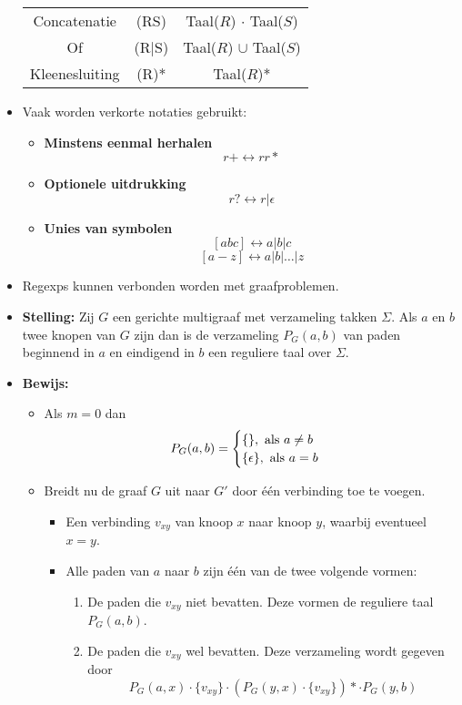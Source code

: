 \begin{itemize}
\begin{table}[h]
\begin{tabular}{c c c}
            \hline
            Concatenatie & (RS) & Taal($R$) $\cdot$ Taal($S$) \\
            Of & (R|S) & Taal($R$) $\cup$ Taal($S$) \\
            Kleenesluiting & (R)* & Taal($R$)* \\
            \hline
        \end{tabular}
    \end{table}
    \item Vaak worden verkorte notaties gebruikt:
    \begin{itemize}
        \item \textbf{Minstens eenmal herhalen}
        $$r+ \leftrightarrow rr*$$
        \item \textbf{Optionele uitdrukking}
        $$r? \leftrightarrow r|\epsilon$$
        
        \item \textbf{Unies van symbolen}
        $$[abc] \leftrightarrow a|b|c$$
        $$[a-z] \leftrightarrow a|b|\dots|z$$

        
    \end{itemize}

    \item Regexps kunnen verbonden worden met graafproblemen.
    \item \textbf{Stelling:} Zij $G$ een gerichte multigraaf met verzameling takken $\Sigma$. Als $a$ en $b$ twee knopen van $G$ zijn dan is de verzameling $P_G(a, b)$ van paden beginnend in $a$ en eindigend in $b$ een reguliere taal over $\Sigma$.
    \item \textbf{Bewijs:}
    \begin{itemize}
        Via inductie op het aantal verbindingen $m$ van $G$.
        \item Als $m = 0$ dan
        $$P_G(a, b) = \begin{cases}
            \{\}, \hbox{ als } a \neq b\\
            \{\epsilon\}, \hbox{ als } a = b 
        \end{cases}$$
        \item Breidt nu de graaf $G$ uit naar $G'$ door één verbinding toe te voegen.
        \begin{itemize}
            \item Een verbinding $v_{xy}$ van knoop $x$ naar knoop $y$, waarbij eventueel $x = y$.
            \item Alle paden van $a$ naar $b$ zijn één van de twee volgende vormen:
            \begin{enumerate}
                \item De paden die $v_{xy}$ niet bevatten. Deze vormen de reguliere taal $P_G(a, b)$.
                \item De paden die $v_{xy}$ wel bevatten. Deze verzameling wordt gegeven door
                $$P_G(a, x) \cdot \{v_{xy}\} \cdot (P_G(y, x) \cdot \{v_{xy}\})* \cdot P_G(y, b)$$


\end{enumerate}
\end{itemize}
\end{itemize}
\end{itemize}
